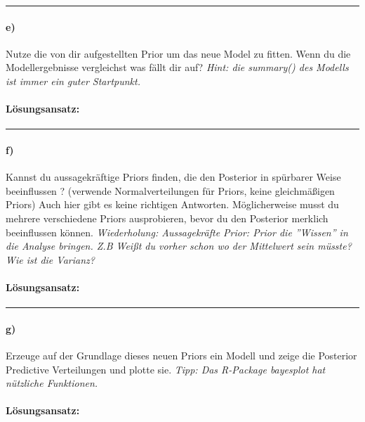 \documentclass[
]{article}
\begin{document}
\begin{center}\rule{0.5\linewidth}{0.5pt}\end{center}

\hypertarget{e}{%
\paragraph{e)}\label{e}}

Nutze die von dir aufgestellten Prior um das neue Model zu fitten. Wenn
du die Modellergebnisse vergleichst was fällt dir auf?
\textit{Hint: die summary() des Modells ist immer ein guter Startpunkt.}

\hypertarget{luxf6sungsansatz-4}{%
\paragraph{Lösungsansatz:}\label{luxf6sungsansatz-4}}

\begin{center}\rule{0.5\linewidth}{0.5pt}\end{center}

\hypertarget{f}{%
\paragraph{f)}\label{f}}

Kannst du aussagekräftige Priors finden, die den Posterior in spürbarer
Weise beeinflussen ? (verwende Normalverteilungen für Priors, keine
gleichmäßigen Priors) Auch hier gibt es keine richtigen Antworten.
Möglicherweise musst du mehrere verschiedene Priors ausprobieren, bevor
du den Posterior merklich beeinflussen können.
\textit{Wiederholung: Aussagekräfte Prior: Prior die ''Wissen'' in die Analyse bringen. Z.B Weißt du vorher schon wo der Mittelwert sein müsste? Wie ist die Varianz?}

\hypertarget{luxf6sungsansatz-5}{%
\paragraph{Lösungsansatz:}\label{luxf6sungsansatz-5}}

\begin{center}\rule{0.5\linewidth}{0.5pt}\end{center}

\hypertarget{g}{%
\paragraph{g)}\label{g}}

Erzeuge auf der Grundlage dieses neuen Priors ein Modell und zeige die
Posterior Predictive Verteilungen und plotte sie.
\textit{Tipp: Das R-Package bayesplot hat nützliche Funktionen.}

\hypertarget{luxf6sungsansatz-6}{%
\paragraph{Lösungsansatz:}\label{luxf6sungsansatz-6}}
\end{document}
